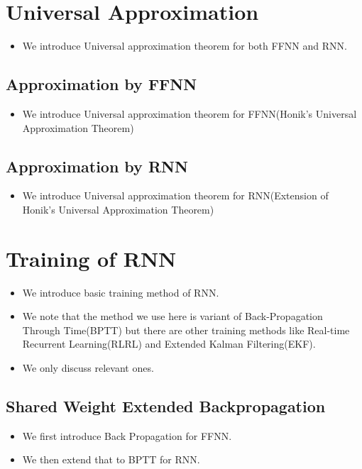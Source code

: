 \documentclass[officiallayout]{tktla}
\begin{document}
\section{Universal Approximation}
\begin{itemize}
\item We introduce Universal approximation theorem for both FFNN and RNN.
\end{itemize}

\subsection{Approximation by FFNN}
\begin{itemize}
\item We introduce Universal approximation theorem for FFNN(Honik's Universal Approximation Theorem)
\end{itemize}

\subsection{Approximation by RNN}
\begin{itemize}
\item We introduce Universal approximation theorem for RNN(Extension of Honik's Universal Approximation Theorem)
\end{itemize}

\section{Training of RNN}\label{training_rnn}
\begin{itemize}
\item We introduce basic training method of RNN.
\item We note that the method we use here is variant of Back-Propagation Through Time(BPTT)  but there are other training methods like Real-time Recurrent Learning(RLRL) and Extended Kalman Filtering(EKF).
\item We only discuss relevant ones.
\end{itemize}

\subsection{Shared Weight Extended Backpropagation}
\begin{itemize}
\item We first introduce Back Propagation for FFNN.
\item We then extend that to BPTT for RNN.
\end{itemize}
\end{document}
